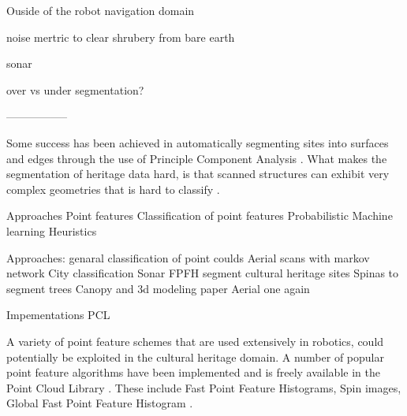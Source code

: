 \documentclass[10pt,twocolumn]{article}
\begin{document}
Ouside of the robot navigation domain

noise mertric to clear shrubery from bare earth

sonar

over vs under segmentation?

-----------------

Some success has been achieved in automatically segmenting sites into surfaces and edges through the use of Principle Component Analysis \cite{Spina2010}. What makes the segmentation of heritage data hard, is that scanned structures can exhibit very complex geometries that is hard to classify \cite{Spina2010}.


Approaches
	Point features
	Classification of point features
		Probabilistic
		Machine learning
		Heuristics


Approaches:
	genaral classification of point coulds
		Aerial scans with markov network \cite{Shapovalov2010}
		City classification \cite{Golovinskiy2009}
		Sonar \cite{Arge2010}
		FPFH \cite{Rusu2009} \cite{Rusu2008}
	segment cultural heritage sites
		Spinas \cite{Spina2010}
	to segment trees
		Canopy and 3d modeling paper \cite{Wang2008}
		Aerial one again \cite{Shapovalov2010}
	
Impementations
	PCL
		
	







A variety of point feature schemes that are used extensively in robotics, could potentially be exploited in the cultural heritage domain. A number of popular point feature algorithms have been implemented and is freely available in the Point Cloud Library \cite{Rusu2011}. These include Fast Point Feature Histograms, Spin images, Global Fast Point Feature Histogram \cite{Rusu2011}.
\end{document}
